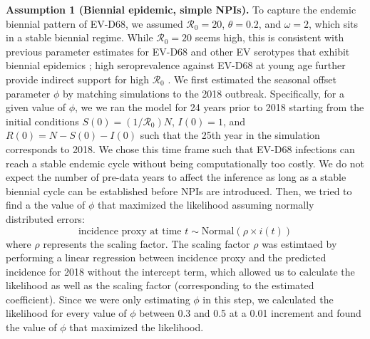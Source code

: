 \documentclass[12pt]{article}
\begin{document}
\textbf{Assumption 1 (Biennial epidemic, simple NPIs).} To capture the endemic biennial pattern of EV-D68, we assumed $\mathcal R_0 = 20$, $\theta=0.2$, and $\omega = 2$, which sits in a stable biennial regime.
While $\mathcal R_0 = 20$ seems high, this is consistent with previous parameter estimates for EV-D68 and other EV serotypes that exhibit biennial epidemics \citep{pons2018serotype,park2021epidemiological};
high seroprevalence against EV-D68 at young age further provide indirect support for high $\mathcal R_0$ \citep{livingston2022neutralizing}.
We first estimated the seasonal offset parameter $\phi$ by matching simulations to the 2018 outbreak.
Specifically, for a given value of $\phi$, we we ran the model for 24 years prior to 2018 starting from the initial conditions $S(0) = (1/\mathcal R_0)N$, $I(0) = 1$, and $R(0) = N - S(0) - I(0)$ such that the 25th year in the simulation corresponds to 2018.
We chose this time frame such that EV-D68 infections can reach a stable endemic cycle without being computationally too costly. We do not expect the number of pre-data years to affect the inference as long as a stable biennial cycle can be established before NPIs are introduced.
Then, we tried to find a the value of $\phi$ that maximized the likelihood assuming normally distributed errors:
\begin{equation}
\textrm{incidence proxy at time }t \sim \mathrm{Normal}(\rho \times i(t))
\end{equation}
where $\rho$ represents the scaling factor.
The scaling factor $\rho$ was estimtaed by performing a linear regression between incidence proxy and the predicted incidence for 2018 without the intercept term, which allowed us to calculate the likelihood as well as the scaling factor (corresponding to the estimated coefficient).
Since we were only estimating $\phi$ in this step, we calculated the likelihood for every value of $\phi$ between 0.3 and 0.5 at a 0.01 increment and found the value of $\phi$ that maximized the likelihood.
\end{document}
